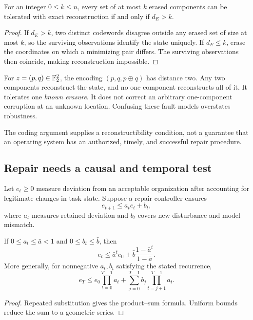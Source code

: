 \begin{MSproposition}\label{MS:prop:erasure}
For an integer $0\leq k\leq n$, every set of at most $k$ erased components can be tolerated with exact reconstruction if and only if $d_E>k$.
\end{MSproposition}
\begin{proof}
If $d_E>k$, two distinct codewords disagree outside any erased set of size at most $k$, so the surviving observations identify the state uniquely. If $d_E\leq k$, erase the coordinates on which a minimizing pair differs. The surviving observations then coincide, making reconstruction impossible.
\end{proof}

For $z=(p,q)\in\mathbb F_2^2$, the encoding $(p,q,p\oplus q)$ has distance two. Any two components reconstruct the state, and no one component reconstructs all of it. It tolerates one \emph{known erasure}. It does not correct an arbitrary one-component corruption at an unknown location. Confusing these fault models overstates robustness.

The coding argument supplies a reconstructibility condition, not a guarantee that an operating system has an authorized, timely, and successful repair procedure.

\subsection{Repair needs a causal and temporal test}
Let $e_t\geq0$ measure deviation from an acceptable organization after accounting for legitimate changes in task state. Suppose a repair controller ensures
\[
e_{t+1}\leq a_t e_t+b_t,
\]
where $a_t$ measures retained deviation and $b_t$ covers new disturbance and model mismatch.

\begin{MSproposition}\label{MS:prop:repair}
If $0\leq a_t\leq\bar a<1$ and $0\leq b_t\leq\bar b$, then
\[
e_t\leq \bar a^t e_0+\bar b\frac{1-\bar a^t}{1-\bar a}.
\]
More generally, for nonnegative $a_t,b_t$ satisfying the stated recurrence,
\[
e_T\leq e_0\prod_{t=0}^{T-1}a_t+
\sum_{j=0}^{T-1}b_j\prod_{t=j+1}^{T-1}a_t.
\]
\end{MSproposition}
\begin{proof}
Repeated substitution gives the product--sum formula. Uniform bounds reduce the sum to a geometric series.
\end{proof}

